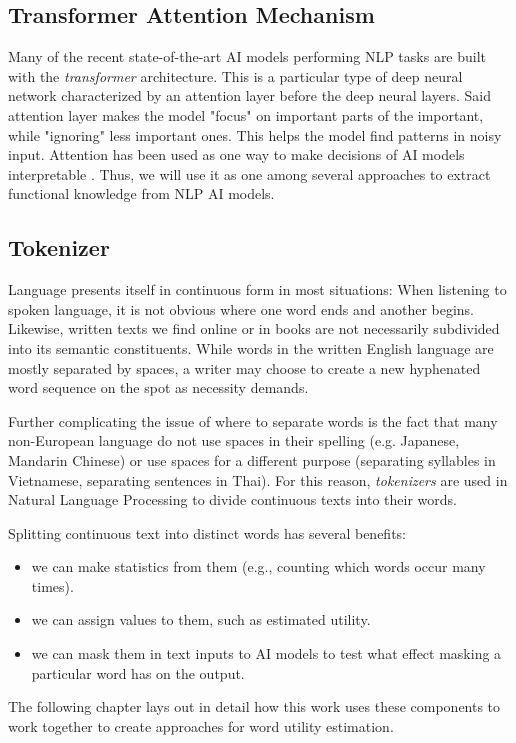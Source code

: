 	\subsection{Transformer Attention Mechanism}
	      Many of the recent state-of-the-art AI models performing NLP tasks are built with the \textit{transformer} architecture.
	      This is a particular type of deep neural network characterized by an attention layer before the deep neural layers.
	      Said attention layer makes the model "focus" on important parts of the important, while "ignoring" less important ones.
	      This helps the model find patterns in noisy input.
	      Attention has been used as one way to make decisions of AI models interpretable  .
	      Thus, we will use it as one among several approaches to extract functional knowledge from NLP AI models.

	\subsection{Tokenizer}
	      Language presents itself in continuous form in most situations:
	      When listening to spoken language, it is not obvious where one word ends and another begins.
	      Likewise, written texts we find online or in books are not necessarily subdivided into its semantic constituents.
	      While words in the written English language are mostly separated by spaces, a writer may choose to create a new hyphenated word sequence on the spot as necessity demands.

	      Further complicating the issue of where to separate words is the fact that many non-European language do not use spaces in their spelling (e.g. Japanese, Mandarin Chinese) or use spaces for a different purpose (separating syllables in Vietnamese, separating sentences in Thai).
		  For this reason, \textit{tokenizers} are used in Natural Language Processing to divide continuous texts into their words. 

	      Splitting continuous text into distinct words has several benefits:
	      \begin{itemize}
		      \item we can make statistics from them (e.g., counting which words occur many times).
		      \item we can assign values to them, such as estimated utility.
		      \item we can mask them in text inputs to AI models to test what effect masking a particular word has on the output.
	      \end{itemize}

The following chapter lays out in detail how this work uses these components to work together to create approaches for word utility estimation.
